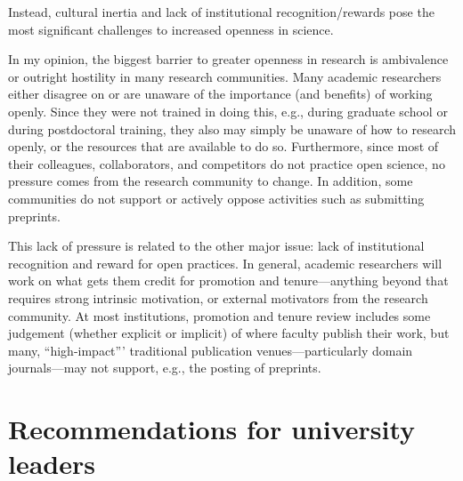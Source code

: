 \documentclass[nobib]{tufte-handout}
\begin{document}
Instead, cultural inertia and lack of institutional recognition\slash rewards pose
the most significant challenges to increased openness in science.

In my opinion, the biggest barrier to greater openness in research is ambivalence
or outright hostility in many research communities. Many academic researchers
either disagree on or are unaware of the importance (and benefits) of working
openly. Since they were not trained in doing this, e.g., during graduate school
or during postdoctoral training, they also may simply be unaware of how to
research openly, or the resources that are available to do so.
Furthermore, since most of their colleagues, collaborators,
and competitors do not practice open science, no pressure comes from the
research community to change. In addition, some communities do not support or
actively oppose activities such as submitting preprints.

This lack of pressure is related to the other major issue: lack of institutional
recognition and reward for open practices. In general, academic researchers will
work on what gets them credit for promotion and tenure---anything beyond that
requires strong intrinsic motivation, or external motivators from the research
community. At most institutions, promotion and tenure review includes some
judgement (whether explicit or implicit) of where faculty publish their work,
but many, ``high-impact''' traditional publication venues---particularly domain
journals---may not support, e.g., the posting of preprints.

\section{Recommendations for university leaders}
\label{sec:recommendations}

\end{document}
